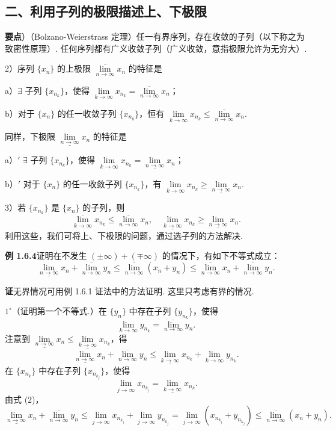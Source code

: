 \documentclass[UTF8, 12pt, fontset=fandol, oneside]{ctexart}
\begin{document}
\subsection*{二、利用子列的极限描述上、下极限}

\noindent\textbf{要点}）（Bolzano-Weierstrass 定理）任一有界序列，存在收敛的子列（以下称之为致密性原理）. 任何序列都有广义收敛子列（广义收敛，意指极限允许为无穷大）.

2）序列 $\{x_n\}$ 的上极限 $\overline{\lim\limits_{n\to\infty}}x_n$ 的特征是

a）$\exists$ 子列 $\{x_{n_k}\}$，使得 $\lim\limits_{k\to\infty}x_{n_k}=\overline{\lim\limits_{n\to\infty}}x_n$；

b）对于 $\{x_n\}$ 的任一收敛子列 $\{x_{n_k}\}$，恒有 $\lim\limits_{k\to\infty}x_{n_k}\le \overline{\lim\limits_{n\to\infty}}x_n$.

同样，下极限 $\underline{\lim\limits_{n\to\infty}}x_n$ 的特征是

a）$'$ $\exists$ 子列 $\{x_{n_k}\}$，使得 $\lim\limits_{k\to\infty}x_{n_k}=\underline{\lim\limits_{n\to\infty}}x_n$；

b）$'$ 对于 $\{x_n\}$ 的任一收敛子列 $\{x_{n_k}\}$，有 $\lim\limits_{k\to\infty}x_{n_k}\ge \underline{\lim\limits_{n\to\infty}}x_n$.

3）若 $\{x_{n_k}\}$ 是 $\{x_n\}$ 的子列，则
\[
  \overline{\lim_{k\to\infty}}x_{n_k}\le \overline{\lim_{n\to\infty}}x_n,\quad
  \underline{\lim_{k\to\infty}}x_{n_k}\ge \underline{\lim_{n\to\infty}}x_n.
\]
利用这些，我们可将上、下极限的问题，通过选子列的方法解决.

\noindent\textbf{例 1.6.4}\quad 证明在不发生 $(\pm\infty)+(\mp\infty)$ 的情况下，有如下不等式成立：
\[
  \underline{\lim_{n\to\infty}}x_n+\overline{\lim_{n\to\infty}}y_n
  \le \overline{\lim_{n\to\infty}}(x_n+y_n)
  \le \overline{\lim_{n\to\infty}}x_n+\overline{\lim_{n\to\infty}}y_n.
\tag{1}
\]

\noindent\textbf{证}\quad 无界情况可用例 1.6.1 证法中的方法证明. 这里只考虑有界的情况.

$1^\circ$（证明第一个不等式.）在 $\{y_n\}$ 中存在子列 $\{y_{n_k}\}$，使得
\[
  \lim_{k\to\infty}y_{n_k}=\overline{\lim_{n\to\infty}}y_n.
\]
注意到 $\underline{\lim\limits_{n\to\infty}}x_n\le \underline{\lim\limits_{k\to\infty}}x_{n_k}$，得
\[
  \underline{\lim_{n\to\infty}}x_n+\overline{\lim_{n\to\infty}}y_n
  \le \underline{\lim_{k\to\infty}}x_{n_k}+\lim_{k\to\infty}y_{n_k}.
\tag{2}
\]
在 $\{x_{n_k}\}$ 中存在子列 $\{x_{n_{k_j}}\}$，使得
\[
  \lim_{j\to\infty}x_{n_{k_j}}=\underline{\lim_{k\to\infty}}x_{n_k}.
\]
由式 (2)，
\[
  \underline{\lim_{n\to\infty}}x_n+\overline{\lim_{n\to\infty}}y_n
  \le \lim_{j\to\infty}x_{n_{k_j}}+\lim_{j\to\infty}y_{n_{k_j}}
  =\lim_{j\to\infty}(x_{n_{k_j}}+y_{n_{k_j}})
  \le \overline{\lim_{n\to\infty}}(x_n+y_n).
\]
\end{document}
